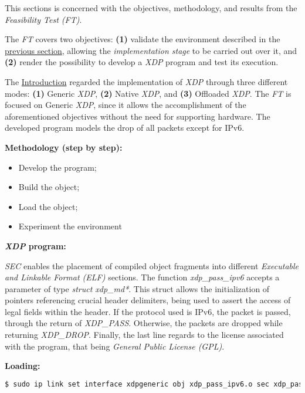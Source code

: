 This sections is concerned with the objectives, methodology, and results from the \textit{Feasibility Test (FT)}.

The \textit{FT} covers two objectives: \textbf{(1)} validate the environment described in the \hyperref[sec:Environment]{previous section}, allowing the \textit{implementation stage} to be carried out over it, and \textbf{(2)} render the possibility to develop a \textit{XDP} program and test its execution.

The \hyperref[sec:Introduction]{Introduction} regarded the implementation of \textit{XDP} through three different modes: \textbf{(1)} Generic \textit{XDP}, \textbf{(2)} Native \textit{XDP}, and \textbf{(3)} Offloaded \textit{XDP}.
The \textit{FT} is focused on Generic \textit{XDP}, since it allows the accomplishment of the aforementioned objectives without the need for supporting hardware.
The developed program models the drop of all packets except for IPv6.

\noindent \textbf{Methodology (step by step):}
\begin{itemize}
    \item Develop the program;
    \item Build the object;
    \item Load the object;
    \item Experiment the environment
\end{itemize}

\noindent \textbf{\textit{XDP} program:}


\textit{SEC} enables the placement of compiled object fragments into different \textit{Executable and Linkable Format (ELF)} sections.
The function \textit{xdp\_pass\_ipv6} accepts a parameter of type \textit{struct xdp\_md*}.
This struct allows the initialization of pointers referencing crucial header delimiters, being used to assert the access of legal fields within the header.
If the protocol used is IPv6, the packet is passed, through the return of \textit{XDP\_PASS}.
Otherwise, the packets are dropped while returning \textit{XDP\_DROP}.
Finally, the last line regards to the license associated with the program, that being \textit{General Public License (GPL)}.

\noindent \textbf{Loading:}

\begin{lstlisting}[language=Bash]
$ sudo ip link set interface xdpgeneric obj xdp_pass_ipv6.o sec xdp_pass_ipv6
\end{lstlisting}


